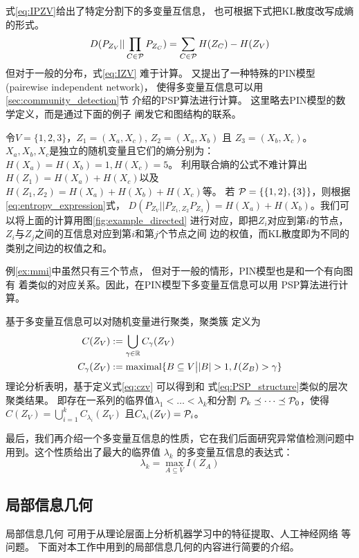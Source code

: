 式\eqref{eq:IPZV}给出了特定分割下的多变量互信息，
也可根据下式把KL散度改写成熵的形式。
\begin{equation}\label{eq:entropy_expression}
  D(P_{Z_V} || \prod_{C\in \P} P_{Z_C}) 
  = \sum_{C \in \P}
  H(Z_C) - H(Z_V)
\end{equation}
但对于一般的分布，式\eqref{eq:IZV}
难于计算。\citet{ska} 又提出了一种特殊的PIN模型
(pairewise independent network)\cite{chan2017pin}，
使得多变量互信息可以用\ref{sec:community_detection}节
介绍的PSP算法进行计算。
这里略去PIN模型的数学定义，而是通过下面的例子
阐发它和图结构的联系。
\begin{example}\label{ex:mmi}
  令$V=\{1,2,3\}$，$Z_1=(X_a, X_c)$,
  $Z_2=(X_a,X_b)$ 且 $Z_3=(X_b,X_c)$。
  $X_a,X_b,X_c$是独立的随机变量且它们的熵分别为：
  $H(X_a)=H(X_b)=1, H(X_c)=5$。
  利用联合熵的公式不难计算出$H(Z_1)=H(X_a)+H(X_c)$以及
  $H(Z_1, Z_2) = H(X_a) + H(X_b) + H(X_c)$等。
  若 $\P=\{\{1,2\}, \{3\}\}$，则根据
  \eqref{eq:entropy_expression}式，
  $D(P_{Z_V}||P_{Z_1,Z_2}P_{Z_3}) = H(X_a)
  +H(X_b)$。我们可以将上面的计算用图\ref{fig:example_directed}
  进行对应，即把$Z_i$对应到第$i$的节点，
  $Z_i$与$Z_j$之间的互信息对应到第$i$和第$j$个节点之间
  边的权值，而KL散度即为不同的类别之间边的权值之和。
\end{example}
例\ref{ex:mmi}中虽然只有三个节点，
但对于一般的情形，PIN模型也是和一个有向图有
着类似的对应关系。因此，在PIN模型下多变量互信息可以用
PSP算法进行计算。

基于多变量互信息可以对随机变量进行聚类，聚类簇
定义为
\begin{align}
  C(Z_V) &:= \bigcup_{\gamma \in \R} C_{\gamma}(Z_V)
  \label{eq:czv}\\
  C_{\gamma}(Z_V) &:= \textrm{maximal}
  \{ B \subseteq V \big\vert |B|>1, I(Z_B) > \gamma  \}
\end{align}
理论分析表明，基于定义式\eqref{eq:czv} 可以得到和
式\eqref{eq:PSP_structure}类似的层次聚类结果。
即存在一系列的临界值$\lambda_1 < \dots < \lambda_k$和分割
$\P_k \preceq \dots \preceq \P_0$，使得
$C(Z_V) = \bigcup_{i=1}^{k} C_{\lambda_i}(Z_V)$
且$C_{\lambda_i}(Z_V) = \P_i$。

最后，我们再介绍一个多变量互信息的性质，它在我们后面研究异常值检测问题中
用到。这个性质给出了最大的临界值 $\lambda_k$
的多变量互信息的表达式\cite{agg_ic}：
\begin{equation}\label{eq:largest_threshold}
\lambda_k = \max_{A\subseteq V} I(Z_A)
\end{equation}

\subsection{局部信息几何}\label{sec:local_geometry}
局部信息几何\cite{huang2019universal}
可用于从理论层面上分析机器学习中的特征提取\cite{huang2017information}、人工神经网络
\cite{huang2019information}等问题。
下面对本工作中用到的局部信息几何的内容进行简要的介绍。

